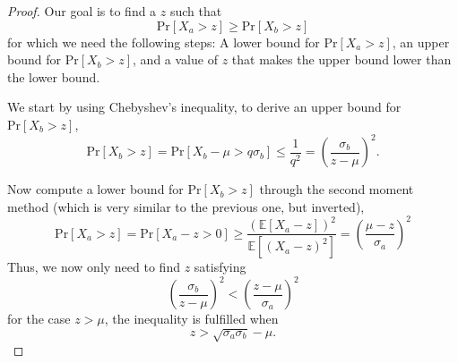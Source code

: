 \begin{proof}
%
Our goal is to find a $z$ such that
\begin{equation}
    \text{Pr}\left[X_a>z\right]\geq \text{Pr}\left[X_b>z\right]%
\end{equation}
for which we need the following steps: A lower bound for $\text{Pr}\left[X_a>z\right]$, an upper bound for $\text{Pr}\left[X_b>z\right]$, and a value of $z$ that makes the upper bound lower than the lower bound.

We start by using Chebyshev's inequality, to derive an upper bound for $\text{Pr}\left[X_b>z\right]$,
\begin{equation}
    \text{Pr}\left[X_b>z\right]= 
     \text{Pr}\left[X_b - \mu >q\sigma_b\right]
     \leq  \dfrac{1}{q^2} = \left(\dfrac{\sigma_b}{z-\mu}\right)^2.
\end{equation}

Now compute a lower bound for $\text{Pr}\left[X_b>z\right]$ through the second moment method (which is very similar to the previous one, but inverted),
\begin{equation}
    \text{Pr}\left[X_a>z\right] = \text{Pr}\left[X_a-z>0\right]
    \geq  \dfrac{\left(\mathbb{E}\left[X_a- z\right]\right)^2}
    {\mathbb{E}\left[\left(X_a-z \right)^2 \right]}
    = \left(\dfrac{\mu - z}{\sigma_a}\right)^2
\end{equation}
Thus, we now only need to find $z$ satisfying
\begin{equation}
    \left(\dfrac{\sigma_b}{z-\mu}\right)^2 <  \left(\dfrac{z-\mu}{\sigma_a}\right)^2
\end{equation}
for the case $z>\mu$, the inequality is fulfilled when
\begin{equation}
    z>\sqrt{\sigma_a \sigma_b }-\mu.
\end{equation}
%
\end{proof}


